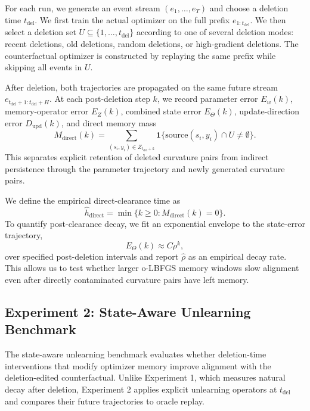 \documentclass{ssl}
\begin{document}
For each run, we generate an event stream \((e_1,\ldots,e_T)\) and choose a deletion time \(t_{\mathrm{del}}\). We first train the actual optimizer on the full prefix \(e_{1:t_{\mathrm{del}}}\). We then select a deletion set \(U\subseteq \{1,\ldots,t_{\mathrm{del}}\}\) according to one of several deletion modes: recent deletions, old deletions, random deletions, or high-gradient deletions. The counterfactual optimizer is constructed by replaying the same prefix while skipping all events in \(U\).

After deletion, both trajectories are propagated on the same future stream \(e_{t_{\mathrm{del}}+1:t_{\mathrm{del}}+H}\). At each post-deletion step \(k\), we record parameter error \(E_w(k)\), memory-operator error \(E_Z(k)\), combined state error \(E_\Theta(k)\), update-direction error \(D_{\mathrm{upd}}(k)\), and direct memory mass
\[
M_{\mathrm{direct}}(k)
=
\sum_{(s_i,y_i)\in Z_{t_{\mathrm{del}}+k}}
\mathbf{1}\{ \mathrm{source}(s_i,y_i)\cap U\neq\emptyset\}.
\]
This separates explicit retention of deleted curvature pairs from indirect persistence through the parameter trajectory and newly generated curvature pairs.

We define the empirical direct-clearance time as
\[
\hat h_{\mathrm{direct}}
=
\min\{k\geq0: M_{\mathrm{direct}}(k)=0\}.
\]
To quantify post-clearance decay, we fit an exponential envelope to the state-error trajectory,
\[
E_\Theta(k)\approx C\rho^k,
\]
over specified post-deletion intervals and report \(\hat\rho\) as an empirical decay rate. This allows us to test whether larger o-LBFGS memory windows slow alignment even after directly contaminated curvature pairs have left memory.

\subsection{Experiment 2: State-Aware Unlearning Benchmark}
The state-aware unlearning benchmark evaluates whether deletion-time interventions that modify optimizer memory improve alignment with the deletion-edited counterfactual. Unlike Experiment 1, which measures natural decay after deletion, Experiment 2 applies explicit unlearning operators at \(t_{\mathrm{del}}\) and compares their future trajectories to oracle replay.
\end{document}
